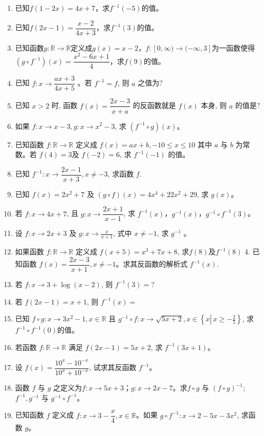 \documentclass[UTF8]{ctexart}
\begin{document}
\begin{enumerate}
    \item 已知$f(1-2x) = 4x + 7$，求$f^{-1}(-5)$的值。
    \item 已知$f(2x - 1) = \dfrac{x - 2}{4x + 3}$，求$f^{-1}(3)$的值。
    \item 已知函数$g:\mathbb{R} \to \mathbb{R}$定义成$g(x) = x - 2$，$f:[0, \infty) \to (-\infty, 3]$为一函数使得$(g\circ f^{-1})(x) = \dfrac{x^2 - 6x + 1}{4}$，求$f(9)$的值。
    \item 已知 $f: x \rightarrow \dfrac{a x+3}{4 x+5}$ 。若 $f^{-1}=f$, 则 $a$ 之值为?
    \item 已知 $x>2$ 时, 函数 $f(x)=\dfrac{2 x-3}{x+a}$ 的反函数就是 $f(x)$ 本身, 则 $a$ 的值是?
    \item 如果 $f: x \rightarrow x-3, g: x \rightarrow x^2-3$, 求 $\left(f^{-1} \circ g\right)(x)$。
    \item 已知函数 $f: \mathbb{R} \rightarrow \mathbb{R}$ 定义成 $f(x)=a x+b,-10 \leq x \leq 10$ 其中 $a$ 与 $b$ 为常数。若 $f(4)=3$及 $f(-2)=6$, 求 $f^{-1}(-1)$ 的值。
    \item 已知 $f^{-1}: x \rightarrow \dfrac{2 x-1}{x+3}, x \neq-3$, 求函数 $f$.
   \item 已知 $f(x)=2 x^2+7$ 及 $(g \circ f)(x)=4 x^4+22 x^2+29$, 求 $g(x)$。
    \item 若 $f: x \rightarrow 4 x+7$, 且 $g: x \rightarrow \dfrac{2 x+1}{x-1}$, 求 $f^{-1}(x)$，$g^{-1}(x)$，$g^{-1} \circ f^{-1}(3)$。
    \item 设 $f: x \rightarrow 2 x+3$ 及 $g: x \rightarrow \frac{x}{x+1}$, 式中 $x \neq-1$, 求 $g^{-1}$ 。
    \item 如果函数 $f: \mathbb{R} \rightarrow \mathbb{R}$ 定义成 $f(x+5)=x^3+7 x+8$, 求$f(8)$及$f^{-1}(8)$
    4. 已知函数 $f(x)=\dfrac{2 x-3}{x+1}, x \neq-1$。求其反函数的解析式 $f^{-1}(x)$.
    \item 若 $f: x \rightarrow 3+\log (x-2)$, 则 $f^{-1}(3)=$?
    \item 若 $f(2 x-1)=x+1$, 则 $f^{-1}(x)=$
    \item 已知 $f \circ g: x \rightarrow 3 x^2-1, x \in \mathbb{R}$ 且 $g^{-1} \circ f: x \rightarrow \sqrt{5 x+2}, x \in\left\{x \left\lvert\, x \geq-\frac{2}{5}\right.\right\}$, 求 $f^{-1} \circ f^{-1}(0)$的值。
    \item 若函数 $f: \mathbb{R} \rightarrow \mathbb{R}$ 满足 $f(2 x-1)=5 x+2$, 求 $f^{-1}(3 x+1)$。
    \item 设 $f(x)=\dfrac{10^x-10^{-x}}{10^x+10^{-x}}$, 试求其反函数 $f^{-1}$。
    \item 函数 $f$ 与 $g$ 之定义为$f: x \rightarrow 5 x+3$；$g: x \rightarrow 2 x-7$。求$f \circ g$ 与 $(f \circ g)^{-1}$; $f^{-1}, g^{-1}$ 与 $g^{-1} \circ f^{-1}$。
    \item 已知函数 $f$ 定义成 $f: x \rightarrow 3-\dfrac{x}{4}, x \in \mathbb{R}$。如果 $g \circ f^{-1}: x \rightarrow 2-5 x-3 x^2$, 求函数 $g$。
\end{enumerate}
\end{document}
